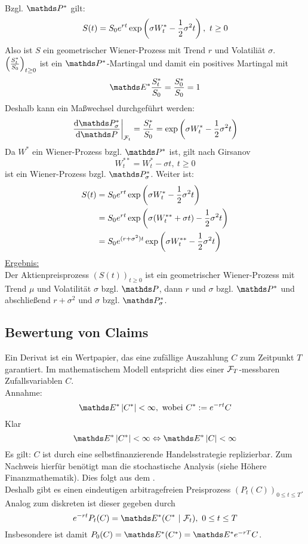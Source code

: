\\
Bzgl. $\Pw^*$ gilt:
\[
S(t)=S_0 e^{r t}\exp\left( \sigma W_t^*-\frac{1}{2}\sigma^2t\right),~t\ge 0
\]
Also ist $S$ ein geometrischer Wiener-Prozess mit Trend $r$ und Volatiliät $\sigma$.\\
$\left( \frac{S_t^*}{S_0}\right)_{t\ge0}$ ist ein $\Pw^*$-Martingal und damit ein positives Martingal mit
\[
\E^*\frac{S_t^*}{S_0}=\frac{S_0^*}{S_0}=1
\]
Deshalb kann ein Maßwechsel durchgeführt werden:
\[
\left.\difff{\Pw_\sigma^*}{\Pw}\right|_{\F_t}=\frac{S_t^*}{S_0}=\exp\enbrace{\sigma W_t^*-\frac{1}{2}\sigma^2t}
\]
Da $W^*$ ein Wiener-Prozess bzgl. $\Pw^*$ ist, gilt nach Girsanov
\[
W_t^{**}=W_t^*-\sigma t,~t\ge0
\]
ist ein Wiener-Prozess bzgl. $\Pw_\sigma^*$.
Weiter ist:
\begin{equation*}
\begin{aligned}
	S(t)&= S_0 e^{r t}\exp\left( \sigma W_t^*-\frac{1}{2}\sigma^2t\right)\\
	&= S_0 e^{rt}\exp\left( \sigma(W_t^{**}+\sigma t)-\frac{1}{2}\sigma^2t\right)\\
	&= S_0 e^{(r+\sigma^2)t}\exp\left( \sigma W_t^{**}-\frac{1}{2}\sigma^2t\right)
\end{aligned}
\end{equation*}
\uline{Ergebnis:}\\
Der Aktienpreisprozess $(S(t))_{t\ge0}$ ist ein geometrischer Wiener-Prozess mit Trend $\mu$ und Volatilität $\sigma$ bzgl. $\Pw$, dann $r$ und $\sigma$ bzgl. $\Pw^*$ und abschließend $r+\sigma^2$ und $\sigma$ bzgl. $\Pw_\sigma^*$. 

\subsection{Bewertung von Claims}
\label{sub:bewertung_claims}
Ein Derivat ist ein Wertpapier, das eine zufällige Auszahlung $C$ zum Zeitpunkt $T$ garantiert.
Im mathematischem Modell entspricht dies einer $\mathcal{F}_T$-messbaren Zufallsvariablen $C$.\\
Annahme:
\[
\E^*\abs{C^*}<\infty, \text{ wobei } C^*:=e^{-rt}C
\]
Klar
\[
\E^*\abs{C^*}<\infty \Leftrightarrow \E^*\abs{C}<\infty
\]
Es gilt:
$C$ ist durch eine selbstfinanzierende Handelsstrategie replizierbar.
Zum Nachweis hierfür benötigt man die stochastische Analysis (siehe Höhere Finanzmathematik).
Dies folgt aus dem .\\
Deshalb gibt es einen eindeutigen arbitragefreien Preisprozess $(P_t(C))_{0\le t\le T}$.
Analog zum diskreten ist dieser gegeben durch
\[
e^{-rt} P_t(C)= \E^*(C^*~|~\F_t),~0\le t\le T
\]
Insbesondere ist damit $P_0(C)=\E^*(C^*)=\E^*e^{-rT}C$.

